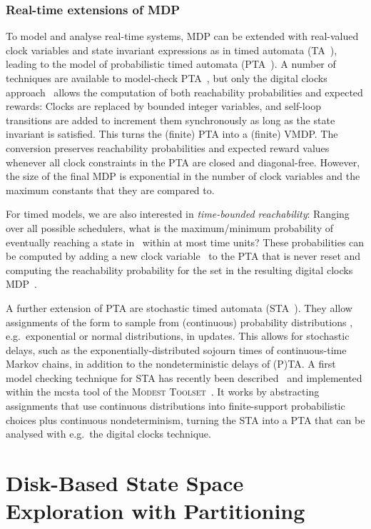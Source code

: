 \documentclass{llncs}
\newcommand{\mcsta}{\textsf{\mbox{mcsta}}\xspace}
\newcommand{\toolset}{\textsc{\mbox{Modest} Toolset}\xspace}
\newcommand{\eg}{e.g.\ }
\begin{document}
\subsubsection{Real-time extensions of MDP}
To model and analyse real-time systems, MDP can be extended with real-valued clock variables and state invariant expressions as in timed automata (TA~\cite{AD94}), leading to the model of probabilistic timed automata (PTA~\cite{KNSS02}).
A number of techniques are available to model-check PTA~\cite{NPS13}, but only the digital clocks approach~\cite{KNPS06} allows the computation of both reachability probabilities and expected rewards:
Clocks are replaced by bounded integer variables, and self-loop transitions are added to increment them synchronously as long as the state invariant is satisfied.
This turns the (finite) PTA into a (finite) VMDP.
The conversion preserves reachability probabilities and expected reward values whenever all clock constraints in the PTA are closed and diagonal-free.
However, the size of the final MDP is exponential in the number of clock variables and the maximum constants that they are compared to.

For timed models, we are also interested in \emph{time-bounded reachability}:
Ranging over all possible schedulers, what is the maximum/minimum probability of eventually reaching a state in~ within at most  time units?
These probabilities can be computed by adding a new clock variable~ to the PTA that is never reset and computing the reachability probability for the set  in the resulting digital clocks MDP~\cite{NPS13}.

A further extension of PTA are stochastic timed automata (STA~\cite{BDHK06}).
They allow assignments of the form  to sample from (continuous) probability distributions , \eg exponential or normal distributions, in updates.
This allows for stochastic delays, such as the exponentially-distributed sojourn times of continuous-time Markov chains, in addition to the nondeterministic delays of (P)TA.
A first model checking technique for STA has recently been described~\cite{HHH14} and implemented within the \mcsta tool of the \toolset~\cite{HH14}.
It works by abstracting assignments that use continuous distributions into finite-support probabilistic choices plus continuous nondeterminism, turning the STA into a PTA that can be analysed with \eg the digital clocks technique.




\section{Disk-Based State Space Exploration with Partitioning}
\label{sec:PartitionedExploration}
\end{document}

